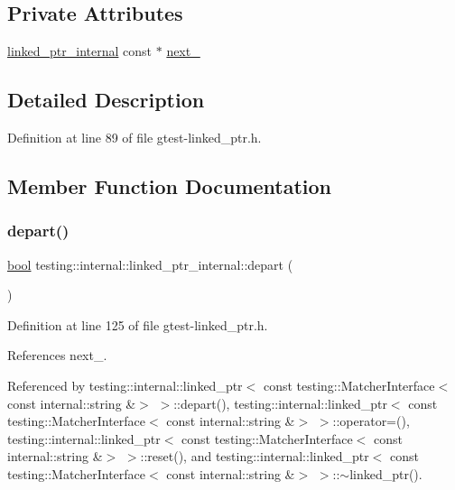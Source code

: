 \subsection*{Private Attributes}
\begin{DoxyCompactItemize}
\item 
\hyperlink{classtesting_1_1internal_1_1linked__ptr__internal}{linked\+\_\+ptr\+\_\+internal} const  $\ast$ \hyperlink{classtesting_1_1internal_1_1linked__ptr__internal_ae4397a65a4d76a24547fcf2cd17131d8}{next\+\_\+}
\end{DoxyCompactItemize}


\subsection{Detailed Description}


Definition at line 89 of file gtest-\/linked\+\_\+ptr.\+h.



\subsection{Member Function Documentation}
\mbox{\label{classtesting_1_1internal_1_1linked__ptr__internal_a8699e539d9702d363ef0351012d1b3ca}} 
\subsubsection{\texorpdfstring{depart()}{depart()}}
{\footnotesize\ttfamily \hyperlink{classbool}{bool} testing\+::internal\+::linked\+\_\+ptr\+\_\+internal\+::depart (\begin{DoxyParamCaption}{ }\end{DoxyParamCaption})\hspace{0.3cm}{\ttfamily [inline]}}



Definition at line 125 of file gtest-\/linked\+\_\+ptr.\+h.



References next\+\_\+.



Referenced by testing\+::internal\+::linked\+\_\+ptr$<$ const testing\+::\+Matcher\+Interface$<$ const internal\+::string \&$>$ $>$\+::depart(), testing\+::internal\+::linked\+\_\+ptr$<$ const testing\+::\+Matcher\+Interface$<$ const internal\+::string \&$>$ $>$\+::operator=(), testing\+::internal\+::linked\+\_\+ptr$<$ const testing\+::\+Matcher\+Interface$<$ const internal\+::string \&$>$ $>$\+::reset(), and testing\+::internal\+::linked\+\_\+ptr$<$ const testing\+::\+Matcher\+Interface$<$ const internal\+::string \&$>$ $>$\+::$\sim$linked\+\_\+ptr().


